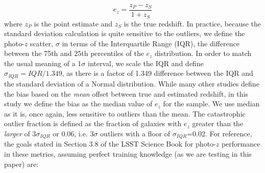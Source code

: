 \documentclass[usenatbib]{mn2e}
\newcommand{\red}[1]{\textcolor{red}{#1}}
\newcommand{\scc}[1]{\textcolor{scc}{#1}}%
\begin{document}
\begin{equation}
e_{z} = \frac{z_{P} -z_{S}}{1+z_{S}} 
\end{equation}
where $z_{P}$ is the point estimate and $z_{S}$ is the true redshift.
In practice, because the standard deviation calculation is quite sensitive to the outliers, we define the photo-$z$ scatter, $\sigma$ in terms of the Interquartile Range (IQR), the difference between the 75th and 25th percentiles of the $e_{z}$ distribution.  In order to match the usual meaning of a 1$\sigma$ interval, we scale the IQR and define $\sigma_{IQR} = IQR/1.349$, as there is a factor of 1.349 difference between the IQR and the standard deviation of a Normal distribution.
While many other studies define the bias based on the {\it mean} offset between true and estimated redshift, in this study we define the bias as the median value of $e_{z}$ for the sample.  We use median as it is, once again, less sensitive to outliers than the mean.  The catastrophic outlier fraction is defined as the fraction of galaxies with $e_{z}$ greater than the {\it larger} of $3\sigma_{IQR}$ or 0.06, i.e. 3$\sigma$ outliers with a floor of $\sigma_{IQR}$=0.02.
For reference, the goals stated in Section 3.8 of the LSST Science Book \citep{Abell:09} for photo-$z$ performance in these metrics, assuming perfect training knowledge (as we are testing in this paper) are:
\end{document}
